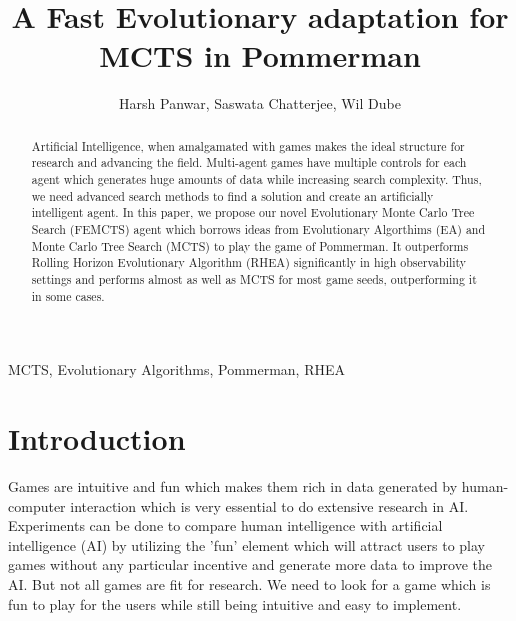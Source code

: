 \documentclass{llncs}
\newcommand{\keywords}[1]{\par\addvspace\baselineskip\noindent\keywordname\enspace\ignorespaces#1}
\begin{document}
\mainmatter

\title{A Fast Evolutionary adaptation for MCTS in Pommerman}
\author{Harsh Panwar, Saswata Chatterjee, Wil Dube}

\maketitle

\begin{abstract}

Artificial Intelligence, when amalgamated with games makes the ideal structure for research and advancing the field. Multi-agent games have multiple controls for each agent which generates huge amounts of data while increasing search complexity. Thus, we need advanced search methods to find a solution and create an artificially intelligent agent. In this paper, we propose our novel Evolutionary Monte Carlo Tree Search (FEMCTS) agent which borrows ideas from Evolutionary Algorthims (EA) and Monte Carlo Tree Search (MCTS) to play the game of Pommerman. It outperforms Rolling Horizon Evolutionary Algorithm (RHEA) significantly in high observability settings and performs almost as well as MCTS for most game seeds, outperforming it in some cases. 

\end{abstract}

\keywords{
MCTS, Evolutionary Algorithms, Pommerman, RHEA}




\section{Introduction} \label{sec:intro}

Games are intuitive and fun which makes them rich in data generated by human-computer interaction which is very essential to do extensive research in AI. Experiments can be done to compare human intelligence with artificial intelligence (AI) by utilizing the 'fun' element which will attract users to play games without any particular incentive and generate more data to improve the AI. But not all games are fit for research. We need to look for a game which is fun to play for the users while still being intuitive and easy to implement. \\
\end{document}
